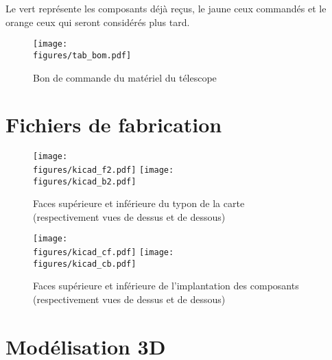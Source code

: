 \vspace{1cm}

Le vert représente les composants déjà reçus, le jaune ceux commandés et le orange ceux qui seront considérés plus tard.

\begin{figure}[H]
    \centering
    \texttt{[image: \\figures/tab\_bom.pdf]}
    \decoRule
    \caption[
    Bon de commande du matériel du télescope]{
    Bon de commande du matériel du télescope}
    \label{fig:Bon de commande du matériel du télescope}
    \end{figure}

\newpage
\section{Fichiers de fabrication}

\begin{figure}[H]
    \centering
    \texttt{[image: \\figures/kicad\_f2.pdf]}
    \texttt{[image: \\figures/kicad\_b2.pdf]}
    \decoRule
    \caption[
    Faces supérieure et inférieure du typon de la carte\\(respectivement vues de dessus et de dessous)]{
    Faces supérieure et inférieure du typon de la carte\\(respectivement vues de dessus et de dessous)}
    \label{fig:Faces supérieure et inférieure du typon de la carte (respectivement vues de dessus et de dessous)}
    \end{figure}

\begin{figure}[H]
    \centering
    \texttt{[image: \\figures/kicad\_cf.pdf]}
    \texttt{[image: \\figures/kicad\_cb.pdf]}
    \decoRule
    \caption[
    Faces supérieure et inférieure de l'implantation des composants\\(respectivement vues de dessus et de dessous)]{
    Faces supérieure et inférieure de l'implantation des composants\\(respectivement vues de dessus et de dessous)}
    \label{fig:Faces supérieure et inférieure de l'implantation des composants (respectivement vues de dessus et de dessous)}
    \end{figure}

\section{Modélisation 3D}

